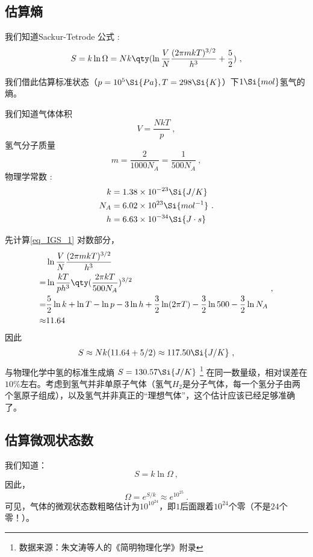 

\subsection{估算熵}
我们知道Sackur-Tetrode 公式 :
\begin{equation}\label{eq_IGS_1}
S = k\ln \Omega  = Nk \qty(\ln \frac{V}{N} \frac{(2\pi mkT)^{3/2}}{h^3} + \frac52)~,
\end{equation}

我们借此估算标准状态（$p=10^5 \Si{Pa}, T=298\Si{K}$）下$1 \Si{mol}$氢气的熵。

我们知道气体体积 
$$V=\frac{NkT}{p}~,$$
氢气分子质量 
$$m = \frac{2}{1000 N_A} = \frac{1}{500 N_A}~,$$
物理学常数 : 
$$
\begin{aligned}
k &= 1.38 \times 10^{-23}\Si{J/K}\\
N_A &= 6.02 \times 10^{23} \Si{mol^{-1}}\\
h &= 6.63\times10^{-34} \Si{J\cdot s}
\end{aligned}
~.$$

先计算\autoref{eq_IGS_1} 对数部分，
$$
\begin{aligned}
 & \ln \frac{V}{N} \frac{(2\pi mkT)^{3/2}}{h^3} \\
 = & \ln \frac{kT}{p h^3} \qty(\frac{2\pi kT}{500 N_A})^{3/2}\\
 = & \frac{5}{2} \ln k + \ln T - \ln p - 3 \ln h + \frac{3}{2} \ln (2 \pi T) - \frac{3}{2} \ln 500 - \frac{3}{2} \ln N_A \\
 \approx & 11.64\\
\end{aligned}~,
$$
因此
$$
\begin{aligned}
S \approx Nk (11.64+5/2) \approx 117.50 \Si{J/K}
\end{aligned}~,
$$
与物理化学中氢的标准生成熵 $S = 130.57 \Si{J/K}$ \footnote{数据来源：朱文涛等人的《简明物理化学》附录} 在同一数量级，相对误差在$10\%$左右。考虑到氢气并非单原子气体（氢气$H_2$是分子气体，每一个氢分子由两个氢原子组成），以及氢气并非真正的“理想气体”，这个估计应该已经足够准确了。

\subsection{估算微观状态数}
我们知道：
\begin{equation}
S = k \ln \Omega~,
\end{equation}
因此，
$$
\Omega = e^{S/k}~ \approx e^{10^{25}} ~.
$$
可见，气体的微观状态数粗略估计为$10^{10^{24}}$，即$1$后面跟着$10^{24}$个零（不是$24$个零！）。


